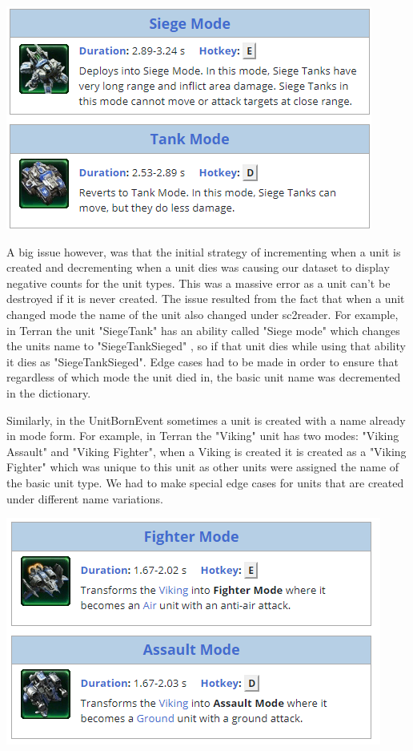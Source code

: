 \documentclass[a4paper,12pt]{report}
\begin{document}
\begin{enumerate}
\begin{center}
    \captionsetup{type=figure}
    \includegraphics[width=.9\linewidth]{media/SiegeTank.png}
\end{center}

A big issue however, was that the initial strategy of incrementing when a unit is created and decrementing when a unit dies was causing our dataset to display negative counts for the unit types. This was a massive error as a unit can’t be destroyed if it is never created. The issue resulted from the fact that when a unit changed mode the name of the unit also changed under sc2reader. For example, in Terran the unit "SiegeTank" has an ability called "Siege mode" which changes the units name to "SiegeTankSieged" , so if that unit dies while using that ability it dies as "SiegeTankSieged". Edge cases had to be made in order to ensure that regardless of which mode the unit died in, the basic unit name was decremented in the dictionary.

Similarly, in the UnitBornEvent sometimes a unit is created with a name already in mode form. For example, in Terran the "Viking" unit has two modes: "Viking Assault" and "Viking Fighter", when a Viking is created it is created as a "Viking Fighter" which was unique to this unit as other units were assigned the name of the basic unit type. We had to make special edge cases for units that are created under different name variations. 

\begin{center}
    \captionsetup{type=figure}
    \includegraphics[width=.9\linewidth]{media/Viking.png}
\end{center}


\end{enumerate}
\end{document}
